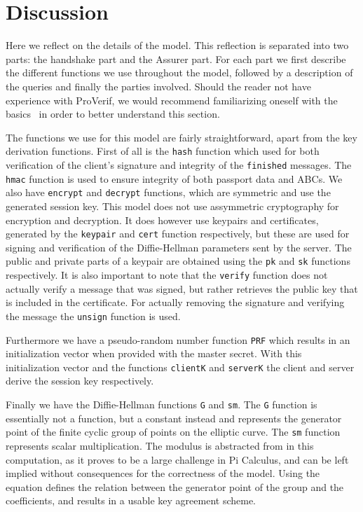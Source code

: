 \section{Discussion}
Here we reflect on the details of the model. This reflection is separated into two parts: the handshake part and the Assurer part. For each part we first describe the different functions we use throughout the model, followed by a description of the queries and finally the parties involved. Should the reader not have experience with ProVerif, we would recommend familiarizing oneself with the basics~\cite{proverifmanual} in order to better understand this section.

The functions we use for this model are fairly straightforward, apart from the key derivation functions. First of all is the \texttt{hash} function which used for both verification of the client's signature and integrity of the \texttt{finished} messages. The \texttt{hmac} function is used to ensure integrity of both passport data and ABCs. We also have \texttt{encrypt} and \texttt{decrypt} functions, which are symmetric and use the generated session key. This model does not use assymmetric cryptography for encryption and decryption. It does however use keypairs and certificates, generated by the \texttt{keypair} and \texttt{cert} function respectively, but these are used for signing and verification of the Diffie-Hellman parameters sent by the server. The public and private parts of a keypair are obtained using the \texttt{pk} and \texttt{sk} functions respectively. It is also important to note that the \texttt{verify} function does not actually verify a message that was signed, but rather retrieves the public key that is included in the certificate. For actually removing the signature and verifying the message the \texttt{unsign} function is used.

Furthermore we have a pseudo-random number function \texttt{PRF} which results in an initialization vector when provided with the master secret. With this initialization vector and the functions \texttt{clientK} and \texttt{serverK} the client and server derive the session key respectively. 

Finally we have the Diffie-Hellman functions \texttt{G} and \texttt{sm}. The \texttt{G} function is essentially not a function, but a constant instead and represents the generator point of the finite cyclic group of points on the elliptic curve. The \texttt{sm} function represents scalar multiplication. The modulus is abstracted from in this computation, as it proves to be a large challenge in Pi Calculus, and can be left implied without consequences for the correctness of the model. Using the equation defines the relation between the generator point of the group and the coefficients, and results in a usable key agreement scheme.

